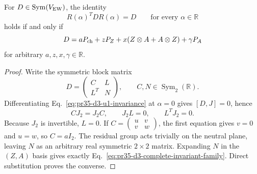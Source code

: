 \begin{theorem}
\label{thm:pr35-d3-u1-classification}
For $D\in\operatorname{Sym}(V_{\rm EW})$, the identity
\begin{equation}
 R(\alpha)^TDR(\alpha)=D\qquad\text{for every }\alpha\in\mathbb R
 \label{eq:pr35-d3-u1-invariance}
\end{equation}
holds if and only if
\begin{equation}
 D=aP_{\rm ch}+zP_Z+x(Z\otimes A+A\otimes Z)+\gamma P_A
 \label{eq:pr35-d3-complete-invariant-family}
\end{equation}
for arbitrary $a,z,x,\gamma\in\mathbb R$.
\end{theorem}

\begin{proof}
Write the symmetric block matrix
\begin{equation}
 D=\begin{pmatrix}C&L\\L^T&N\end{pmatrix},
 \qquad C,N\in\operatorname{Sym}_2(\mathbb R).
\end{equation}
Differentiating Eq.~\eqref{eq:pr35-d3-u1-invariance} at $\alpha=0$ gives
$[D,J]=0$, hence
\begin{equation}
 CJ_2=J_2C,\qquad J_2L=0,\qquad L^TJ_2=0.
\end{equation}
Because $J_2$ is invertible, $L=0$.  If
$C=\left(\begin{smallmatrix}u&v\\v&w\end{smallmatrix}\right)$, the first
equation gives $v=0$ and $u=w$, so $C=aI_2$.  The residual group acts trivially on the neutral plane, leaving $N$ as an arbitrary real symmetric $2\times2$ matrix.  Expanding $N$ in the $(Z,A)$ basis gives exactly
Eq.~\eqref{eq:pr35-d3-complete-invariant-family}.  Direct substitution proves
the converse.
\end{proof}


